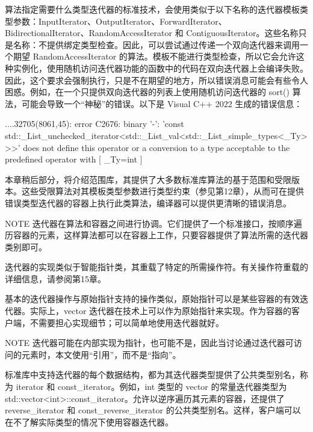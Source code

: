 算法指定需要什么类型迭代器的标准技术，会使用类似于以下名称的迭代器模板类型参数：InputIterator、OutputIterator、ForwardIterator、BidirectionalIterator、RandomAccessIterator 和 ContiguousIterator。这些名称只是名称：不提供绑定类型检查。因此，可以尝试通过传递一个双向迭代器来调用一个期望 RandomAccessIterator 的算法。模板不能进行类型检查，所以它会允许这种实例化，使用随机访问迭代器功能的函数中的代码在双向迭代器上会编译失败。因此，这个要求会强制执行，只是不在期望的地方，所以错误消息可能会有些令人困惑。例如，在一个只提供双向迭代器的列表上使用随机访问迭代器的 sort() 算法，可能会导致一个“神秘”的错误。以下是 Visual C++ 2022 生成的错误信息：

\begin{shell}
...\MSVC{}.32705\algorithm(8061,45): error C2676: binary '-': 'const
std::_List_unchecked_iterator<std::_List_val<std::_List_simple_types<_Ty>>>' does
not define this operator or a conversion to a type acceptable to the
predefined operator
    with
    [
    _Ty=int
    ]
\end{shell}

本章稍后部分，将介绍范围库，其提供了大多数标准库算法的基于范围和受限版本。这些受限算法对其模板类型参数进行类型约束（参见第12章），从而可在提供错误类型迭代器的容器上执行此类算法，编译器可以提供更清晰的错误消息。

\begin{myNotic}{NOTE}
迭代器在算法和容器之间进行协调。它们提供了一个标准接口，按顺序遍历容器的元素，这样算法都可以在容器上工作，只要容器提供了算法所需的迭代器类别即可。
\end{myNotic}

迭代器的实现类似于智能指针类，其重载了特定的所需操作符。有关操作符重载的详细信息，请参阅第15章。

基本的迭代器操作与原始指针支持的操作类似，原始指针可以是某些容器的有效迭代器。实际上，vector 迭代器在技术上可以作为原始指针来实现。作为容器的客户端，不需要担心实现细节；可以简单地使用迭代器就好。

\begin{myNotic}{NOTE}
迭代器可能在内部实现为指针，也可能不是，因此当讨论通过迭代器可访问的元素时，本文使用“引用”，而不是“指向”。
\end{myNotic}


标准库中支持迭代器的每个数据结构，都为其迭代器类型提供了公共类型别名，称为 iterator 和 const\_iterator。例如，int 类型的 vector 的常量迭代器类型为 std::vector<int>::const\_iterator。允许以逆序遍历其元素的容器，还提供了 reverse\_iterator 和 const\_reverse\_iterator 的公共类型别名。这样，客户端可以在不了解实际类型的情况下使用容器迭代器。

